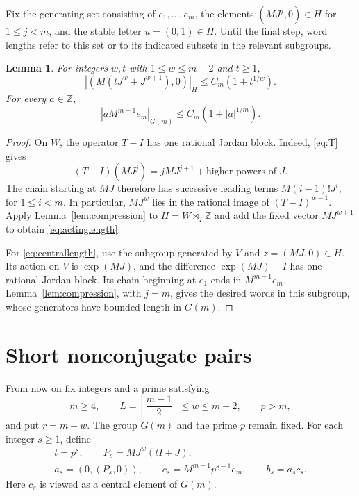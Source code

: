 \documentclass[11pt]{article}
\numberwithin{equation}{section}
\newtheorem{lemma}[theorem]{Lemma}
\theoremstyle{remark}
\newcommand{\Z}{\mathbb Z}
\begin{document}
Fix the generating set consisting of $e_1,\ldots,e_m$, the elements
$(MJ^j,0)\in H$ for $1\le j<m$, and the stable letter
$u=(0,1)\in H$. Until the final step, word lengths refer to this set
or to its indicated subsets in the relevant subgroups.

\begin{lemma}\label{lem:groupcompression}
For integers $w,t$ with $1\le w\le m-2$ and $t\ge1$,
\begin{equation}\label{eq:actinglength}
 |(M(tJ^w+J^{w+1}),0)|_H\le C_m(1+t^{1/w}).
\end{equation}
For every $a\in\Z$,
\begin{equation}\label{eq:centrallength}
 |aM^{m-1}e_m|_{G(m)}\le C_m(1+|a|^{1/m}).
\end{equation}
\end{lemma}

\begin{proof}
On $W$, the operator $T-I$ has one rational Jordan block. Indeed,
\eqref{eq:T} gives
\[
 (T-I)(MJ^j)=jMJ^{j+1}+\text{higher powers of }J.
\]
The chain starting at $MJ$ therefore has successive leading terms
$M(i-1)!J^i$, for $1\le i<m$. In particular, $MJ^w$ lies in the
rational image of $(T-I)^{w-1}$. Apply Lemma~\ref{lem:compression}
to $H=W\rtimes_T\Z$ and add the fixed vector $MJ^{w+1}$ to obtain
\eqref{eq:actinglength}.

For \eqref{eq:centrallength}, use the subgroup generated by $V$ and
$z=(MJ,0)\in H$. Its action on $V$ is $\exp(MJ)$, and the difference
$\exp(MJ)-I$ has one rational Jordan block. Its chain beginning at
$e_1$ ends in $M^{m-1}e_m$. Lemma~\ref{lem:compression}, with $j=m$,
gives the desired words in this subgroup, whose generators have bounded
length in $G(m)$.
\end{proof}

\section{Short nonconjugate pairs}\label{sec:pairs}

From now on fix integers and a prime satisfying
\begin{equation}\label{eq:parameters}
 m\ge4,\qquad
 L=\left\lceil\frac{m-1}{2}\right\rceil\le w\le m-2,
 \qquad p>m,
\end{equation}
and put $r=m-w$. The group $G(m)$ and the prime $p$ remain fixed.
For each integer $s\ge1$, define
\begin{equation}\label{eq:pairs}
 \begin{gathered}
 t=p^s,\qquad P_s=MJ^w(tI+J),\\
 a_s=(0,(P_s,0)),\qquad c_s=M^{m-1}p^{s-1}e_m,\qquad
 b_s=a_sc_s.
 \end{gathered}
\end{equation}
Here $c_s$ is viewed as a central element of $G(m)$.
\end{document}
